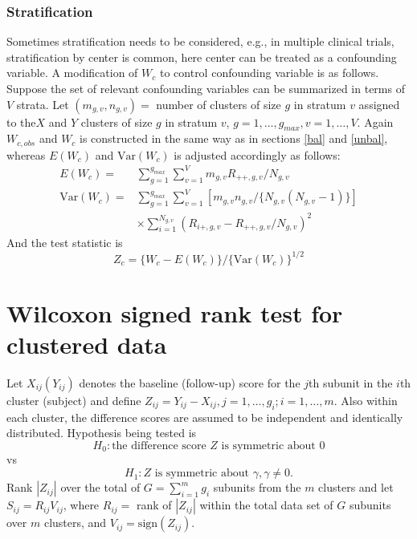 \documentclass[article]{jss}
\begin{document}
\subsubsection{Stratification}
Sometimes stratification needs to be considered, e.g., in multiple clinical trials, stratification by center is common, here center can be treated as a confounding variable. A modification of $W_c$ to control confounding variable is as follows. Suppose the set of relevant confounding variables can be summarized in terms of $V$ strata. Let $(m_{g,v}, n_{g,v})=$ number of clusters of size $g$ in stratum $v$ assigned to the$X$ and $Y$ clusters of size $g$ in stratum $v$, $g = 1, \ldots, g_{max}, v = 1, \ldots, V$. Again $W_{c,obs}$ and $W_c$ is constructed in the same way as in sections \ref{bal} and \ref{unbal}, whereas $E(W_c)$ and $\text{Var}(W_c)$ is adjusted accordingly as follows:
\begin{align*}
E(W_c)=& \sum_{g=1}^{g_{max}}\sum^V_{v=1}m_{g,v}R_{++,g,v}/N_{g,v}\\
\text{Var}(W_c)=& \sum_{g=1}^{g_{max}}\sum_{v=1}^V[m_{g,v}n_{g,v}/\{N_{g,v}(N_{g,v} - 1)\}]\\ 
&\times\sum_{i=1}^{N_{g,v}}(R_{i+, g, v} - R_{++, g, v}/N_{g,v})^2
\end{align*}
And the test statistic is
\begin{equation}
Z_c = \{W_c - E(W_c)\}/\{\text{Var}(W_c)\}^{1/2}
\end{equation}
\section{Wilcoxon signed rank test for clustered data}
Let $X_{ij} (Y_{ij})$ denotes the baseline (follow-up) score for the $j$th subunit in the $i$th cluster (subject) and define $Z_{ij} = Y_{ij} - X_{ij}, j = 1, \ldots,g_i; i = 1,\ldots,m$. Also within each cluster, the difference scores are assumed to be independent and identically distributed. Hypothesis being tested is
\begin{equation*}
H_0: \text{the difference score } Z \text{ is symmetric about 0}
\end{equation*}
vs
\begin{equation*}
H_1: Z \text{ is symmetric about }\gamma, \gamma \not = 0.
\end{equation*}
Rank $|Z_{ij}|$ over the total of $G = \sum_{i=1}^m g_i$ subunits from the $m$ clusters and let $S_{ij}=R_{ij}V_{ij}$, where $R_{ij} = $ rank of $|Z_{ij}|$ within the total data set of $G$ subunits over $m$ clusters, and $V_{ij} = \text{sign}(Z_{ij})$.
\end{document}

